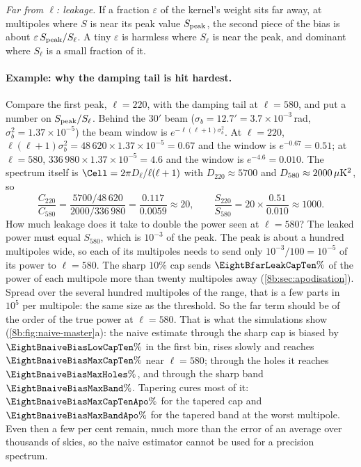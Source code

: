 \emph{Far from $\ell$: leakage.} If a fraction $\varepsilon$ of the kernel's weight sits far away, at multipoles
where $S$ is near its peak value $S_{\rm peak}$, the second piece of the bias is about
$\varepsilon\,S_{\rm peak}/S_\ell$. A tiny $\varepsilon$ is harmless where $S_\ell$ is near the peak, and dominant where $S_\ell$
is a small fraction of it.

\paragraph{Example: why the damping tail is hit hardest.}
Compare the first peak, $\ell=220$, with the damping tail at $\ell=580$, and put a number on
$S_{\rm peak}/S_\ell$. Behind the $30'$ beam ($\sigma_b=12.7'=3.7\times10^{-3}$\,rad, $\sigma_b^2=1.37\times10^{-5}$) the
beam window is $e^{-\ell(\ell+1)\sigma_b^2}$. At $\ell=220$, $\ell(\ell+1)\sigma_b^2=48\,620\times1.37\times10^{-5}=0.67$ and
the window is $e^{-0.67}=0.51$; at $\ell=580$, $336\,980\times1.37\times10^{-5}=4.6$ and the window is
$e^{-4.6}=0.010$. The spectrum itself is $\Cell=2\pi D_\ell/\ell(\ell+1)$ with $D_{220}\approx5700$ and
$D_{580}\approx2000\,\mu{\rm K}^2$, so
\[
  \frac{C_{220}}{C_{580}}=\frac{5700/48\,620}{2000/336\,980}=\frac{0.117}{0.0059}\approx20,
  \qquad
  \frac{S_{220}}{S_{580}}=20\times\frac{0.51}{0.010}\approx1000 .
\]
How much leakage does it take to double the power seen at $\ell=580$? The leaked power must equal
$S_{580}$, which is $10^{-3}$ of the peak. The peak is about a hundred multipoles wide, so each of its
multipoles needs to send only $10^{-3}/100=10^{-5}$ of its power to $\ell=580$. The sharp $10\%$ cap sends
$\EightBfarLeakCapTen\%$ of the power of each multipole more than twenty multipoles away
(\cref{8b:sec:apodisation}). Spread over the several hundred multipoles of the range, that is a few
parts in $10^5$ per multipole: the same size as the threshold. So the far term should be of the order
of the true power at $\ell=580$. That is what the simulations show
(\cref{8b:fig:naive-master}a): the naive estimate through the sharp cap is biased by $\EightBnaiveBiasLowCapTen\%$
in the first bin, rises slowly and reaches $\EightBnaiveBiasMaxCapTen\%$ near $\ell=580$; through the holes
it reaches $\EightBnaiveBiasMaxHoles\%$, and through the sharp band $\EightBnaiveBiasMaxBand\%$. Tapering
cures most of it: $\EightBnaiveBiasMaxCapTenApo\%$ for the tapered cap and $\EightBnaiveBiasMaxBandApo\%$ for the
tapered band at the worst multipole. Even then a few per cent remain, much more than the error of
an average over thousands of skies, so the naive estimator cannot be used for a precision
spectrum.

